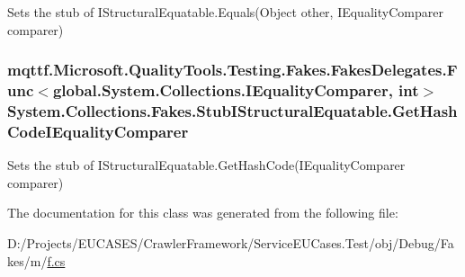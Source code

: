 Sets the stub of I\-Structural\-Equatable.\-Equals(\-Object other, I\-Equality\-Comparer comparer)

\hypertarget{class_system_1_1_collections_1_1_fakes_1_1_stub_i_structural_equatable_aafdcb31f71c4e922cd448ed44d65d8d4}{
\subsubsection[{Get\-Hash\-Code\-I\-Equality\-Comparer}]{\setlength{\rightskip}{0pt plus 5cm}mqttf.\-Microsoft.\-Quality\-Tools.\-Testing.\-Fakes.\-Fakes\-Delegates.\-Func$<$global.\-System.\-Collections.\-I\-Equality\-Comparer, int$>$ System.\-Collections.\-Fakes.\-Stub\-I\-Structural\-Equatable.\-Get\-Hash\-Code\-I\-Equality\-Comparer}}\label{class_system_1_1_collections_1_1_fakes_1_1_stub_i_structural_equatable_aafdcb31f71c4e922cd448ed44d65d8d4}


Sets the stub of I\-Structural\-Equatable.\-Get\-Hash\-Code(\-I\-Equality\-Comparer comparer)



The documentation for this class was generated from the following file\-:\begin{DoxyCompactItemize}
\item 
D\-:/\-Projects/\-E\-U\-C\-A\-S\-E\-S/\-Crawler\-Framework/\-Service\-E\-U\-Cases.\-Test/obj/\-Debug/\-Fakes/m/\hyperlink{m_2f_8cs}{f.\-cs}\end{DoxyCompactItemize}
